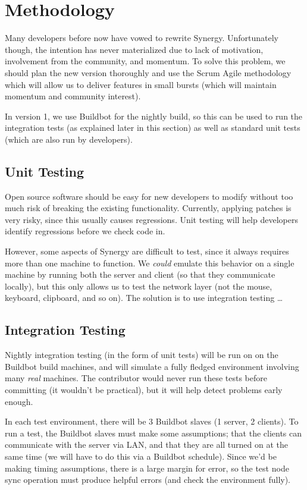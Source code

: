 \section{Methodology}

Many developers before now have vowed to rewrite Synergy. Unfortunately though,
the intention has never materialized due to lack of motivation, involvement from
the community, and momentum.
To solve this problem, we should plan the new version thoroughly and use the
Scrum Agile methodology which will allow us to deliver features in small 
bursts (which will maintain momentum and community interest).

In version 1, we use Buildbot for the nightly build, so this can be used to run
the integration tests (as explained later in this section) as well as standard 
unit tests (which are also run by developers).

\subsection{Unit Testing}

Open source software should be easy for new developers to modify without too
much risk of breaking the existing functionality. Currently, applying patches 
is very risky, since this usually causes regressions. Unit testing will help 
developers identify regressions before we check code in.

However, some aspects of Synergy are difficult to test, since it always requires
more than one machine to function. We \textit{could} emulate this behavior on a 
single machine by running both the server and client (so that they communicate 
locally), but this only allows us to test the network layer (not the mouse,
keyboard, clipboard, and so on). The solution is to use integration testing
\ldots

\subsection{Integration Testing}

Nightly integration testing (in the form of unit tests) will be run on on the 
Buildbot build machines, and will
simulate a fully fledged environment involving many \textit{real} machines. The 
contributor would never run these tests before committing (it wouldn't be 
practical), but it will help detect problems early enough.

In each test environment, there will be 3 Buildbot slaves (1 server, 2 clients).
To run a test, the Buildbot slaves must make some assumptions; that the clients
can communicate with the server via LAN, and that they are all turned on at the 
same time (we will have to do this via a Buildbot schedule). Since we'd be 
making timing assumptions, there is a large margin for error, so the test node
sync operation must produce helpful errors (and check the environment fully).

